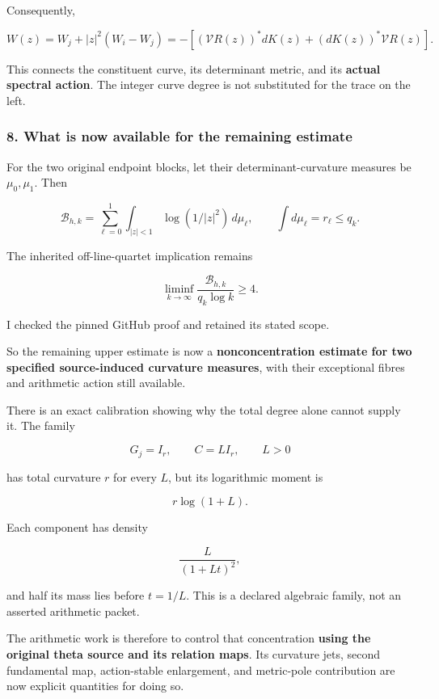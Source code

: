 Consequently,

\[
\boxed{
W(z)=W_j+|z|^2(W_i-W_j)
=
-\left[
(\mathcal VR(z))^*dK(z)
+
(dK(z))^*\mathcal VR(z)
\right].
}
\]

This connects the constituent curve, its determinant metric, and its \textbf{actual spectral action}. The integer curve degree is not substituted for the trace on the left.

\subsubsection{8. What is now available for the remaining estimate}\label{endpoint-curvature_original--what-is-now-available-for-the-remaining-estimate}

For the two original endpoint blocks, let their determinant-curvature measures be \(\mu_0,\mu_1\). Then

\[
\boxed{
\mathcal B_{h,k}
=
\sum_{\ell=0}^{1}
\int_{|z|<1}
\log(1/|z|^2)\,d\mu_\ell,
\qquad
\int d\mu_\ell=r_\ell\le q_k.
}
\]

The inherited off-line-quartet implication remains

\[
\liminf_{k\to\infty}
\frac{\mathcal B_{h,k}}{q_k\log k}\ge4.
\]

I checked the pinned GitHub proof and retained its stated scope.

So the remaining upper estimate is now a \textbf{nonconcentration estimate for two specified source-induced curvature measures}, with their exceptional fibres and arithmetic action still available.

There is an exact calibration showing why the total degree alone cannot supply it. The family

\[
G_j=I_r,\qquad C=LI_r,\qquad L>0
\]

has total curvature \(r\) for every \(L\), but its logarithmic moment is

\[
r\log(1+L).
\]

Each component has density

\[
\frac{L}{(1+Lt)^2},
\]

and half its mass lies before \(t=1/L\). This is a declared algebraic family, not an asserted arithmetic packet.

The arithmetic work is therefore to control that concentration \textbf{using the original theta source and its relation maps}. Its curvature jets, second fundamental map, action-stable enlargement, and metric-pole contribution are now explicit quantities for doing so.


